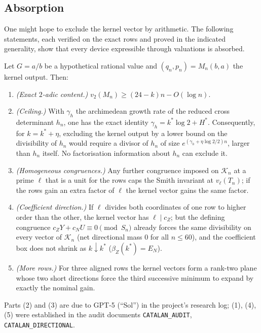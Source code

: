 \subsection{Absorption}

One might hope to exclude the kernel vector by arithmetic. The following statements, each verified on the exact rows and proved in the indicated generality, show that every device expressible through valuations is absorbed.

\begin{theorem}[Absorption]\label{thm:absorption}
Let $G=a/b$ be a hypothetical rational value and $(q_n,p_n)=M_n(b,a)$ the kernel output. Then:
\begin{enumerate}
\item \emph{(Exact $2$-adic content.)} $v_2(M_n)\ge(24-k)n-O(\log n)$.
\item \emph{(Ceiling.)} With $\gamma_h$ the archimedean growth rate of the reduced cross determinant $h_n$, one has the exact identity $\gamma_h=k^*\log2+H^*$. Consequently, for $k=k^*+\eta$, excluding the kernel output by a lower bound on the divisibility of $h_n$ would require a divisor of $h_n$ of size $e^{(\gamma_h+\eta\log2/2)n}$, larger than $h_n$ itself. No factorisation information about $h_n$ can exclude it.
\item \emph{(Homogeneous congruences.)} Any further congruence imposed on $\mathcal K_n$ at a prime $\ell$ that is a unit for the rows caps the Smith invariant at $v_\ell(T_n)$; if the rows gain an extra factor of $\ell$ the kernel vector gains the same factor.
\item \emph{(Coefficient direction.)} If $\ell$ divides both coordinates of one row to higher order than the other, the kernel vector has $\ell\mid c_Z$; but the defining congruence $c_ZY+c_NU\equiv0\pmod{S_n}$ already forces the same divisibility on every vector of $\mathcal K_n$ (net directional mass $0$ for all $n\le60$), and the coefficient box does not shrink as $k\downarrow k^*$ ($\beta_Z(k^*)=E_N$).
\item \emph{(More rows.)} For three aligned rows the kernel vectors form a rank-two plane whose two short directions force the third successive minimum to expand by exactly the nominal gain.
\end{enumerate}
\end{theorem}
Parts (2) and (3) are due to GPT-5 (``Sol'') in the project's research log; (1), (4), (5) were established in the audit documents \texttt{CATALAN\_AUDIT}, \texttt{CATALAN\_DIRECTIONAL}.

